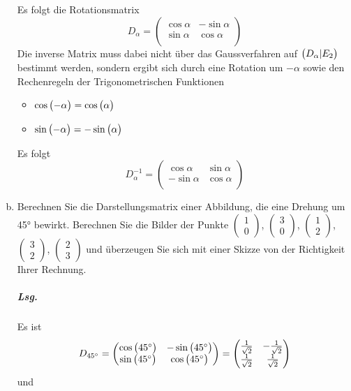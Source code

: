 \documentclass{scrreprt}
\begin{document}
\begin{enumerate}[(a)]
  Es folgt die Rotationsmatrix
  \[
    D_{\alpha} = \begin{pmatrix}
      \cos\alpha & -\sin\alpha \\
      \sin\alpha & \cos\alpha  \\
    \end{pmatrix}
  \]
  Die inverse Matrix muss dabei nicht über das Gaussverfahren auf
  $\qty\big(D_{\alpha}|E_2)$ bestimmt werden, sondern ergibt sich durch eine
  Rotation um $-\alpha$ sowie den Rechenregeln der Trigonometrischen Funktionen
  \begin{itemize}
  \item $\cos\qty\big(-\alpha) = \cos\qty\big(\alpha)$
  \item $\sin\qty\big(-\alpha) = -\sin\qty\big(\alpha)$
  \end{itemize}
  Es folgt
  \[
    D_{\alpha}^{-1} = \begin{pmatrix}
      \cos\alpha & \sin\alpha \\
      -\sin\alpha & \cos\alpha  \\
    \end{pmatrix}
  \]

\item Berechnen Sie die Darstellungsmatrix einer Abbildung, die eine Drehung um
  45° bewirkt.
  Berechnen Sie die Bilder der Punkte $\begin{pmatrix} 1 \\ 0 \end{pmatrix}$,
  $\begin{pmatrix} 3 \\ 0 \end{pmatrix}$, $\begin{pmatrix} 1 \\ 2 \end{pmatrix}$,
  $\begin{pmatrix} 3 \\ 2 \end{pmatrix}$, $\begin{pmatrix} 2 \\ 3 \end{pmatrix}$
  und überzeugen Sie sich mit einer Skizze von der Richtigkeit Ihrer Rechnung.

  \subparagraph{Lsg.} Es ist
  \[
    D_{45^{\circ}} = \begin{pmatrix}
      \cos\qty\big(45^{\circ}) & -\sin\qty\big(45^{\circ}) \\
      \sin\qty\big(45^{\circ}) & \cos\qty\big(45^{\circ})  \\
    \end{pmatrix} = \begin{pmatrix}
      \frac{1}{\sqrt{2}} & -\frac{1}{\sqrt{2}} \\
      \frac{1}{\sqrt{2}} & \frac{1}{\sqrt{2}}  \\
    \end{pmatrix}
  \]
  und


\end{enumerate}
\end{document}
